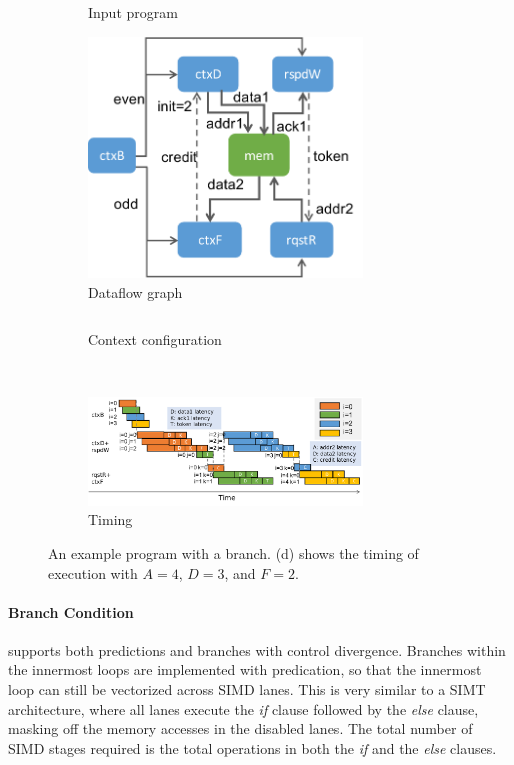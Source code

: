 \begin{figure}
\centering
  \vspace{-1cm}
\begin{subfigure}[b]{0.45\textwidth}
\inputminted{python}{code/branch.py}
\caption{Input program}
  \vspace{0.2cm}
\includegraphics[width=0.8\textwidth]{figs/branchctx.pdf}
\caption{Dataflow graph}
\end{subfigure}
\hfill
\begin{subfigure}[b]{0.48\textwidth}
\inputminted{python}{code/branchctx.py}
\caption{Context configuration}
\end{subfigure}
\\
  \vspace{0.2cm}
\begin{subfigure}[b]{\textwidth}
  \centering
\includegraphics[width=0.8\textwidth]{figs/branchtiming.pdf}
\caption{Timing}
\end{subfigure}
\caption[Branching example]{
  An example program with a branch. 
  (d) shows the timing of execution with $A=4$, $D=3$, and $F=2$.
}
\label{fig:branch} 
\end{figure}

\paragraph{Branch Condition}
\name supports both predictions and branches with control divergence.
Branches within the innermost loops are implemented with predication, so that the innermost loop can still be
vectorized across SIMD lanes.
This is very similar to a SIMT architecture, where all lanes execute the \emph{if} clause followed
by the \emph{else} clause, masking off the memory accesses in the disabled lanes.
The total number of SIMD stages required is the total operations in both the \emph{if} and the \emph{else} clauses.

